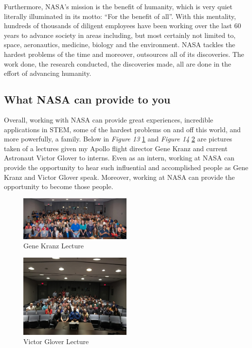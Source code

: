 \documentclass{article}
\let\Oldsubsection\subsection
\renewcommand{\subsection}{\FloatBarrier\Oldsubsection}
\begin{document}
Furthermore, NASA’s mission is the benefit of humanity, which is very quiet literally illuminated in its motto: “For the benefit of all”. With this mentality, hundreds of thousands of diligent employees have been working over the last 60 years to advance society in areas including, but most certainly not limited to, space, aeronautics, medicine, biology and the environment. NASA tackles the hardest problems of the time and moreover, outsources all of its discoveries. The work done, the research conducted, the discoveries made, all are done in the effort of advancing humanity.

\subsection{What NASA can provide to you}

Overall, working with NASA can provide great experiences, incredible applications in STEM, some of the hardest problems on and off this world, and more powerfully, a family. Below in \textit{Figure 13} \ref{fig:bigoutreachgroup} and \textit{Figure 14} \ref{fig:smalleroutreachgroup} are pictures taken of a lectures given my Apollo flight director Gene Kranz and current Astronaut Victor Glover to interns. Even as an intern, working at NASA can provide the opportunity to hear such influential and accomplished people as Gene Kranz and Victor Glover speak. Moreover, working at NASA can provide the opportunity to become those people.

\begin{figure}[!htb]
  \centering
  \includegraphics[width=0.5\textwidth]{assets/bigoutreachgroup.jpg}
  \caption{Gene Kranz Lecture}
  \label{fig:bigoutreachgroup}
\end{figure}

\begin{figure}[!htb]
  \centering
  \includegraphics[width=0.5\textwidth]{assets/smalleroutreachgroup.png}
  \caption{Victor Glover Lecture}
  \label{fig:smalleroutreachgroup}
\end{figure}
\end{document}
